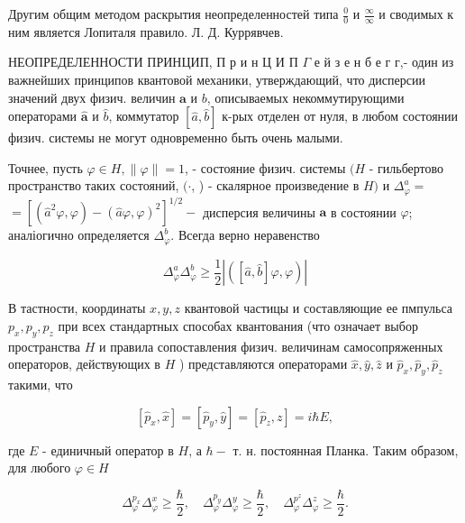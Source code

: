 \documentclass[10pt]{article}
\begin{document}
Другим общим методом раскрытия неопределенностей типа $\frac{0}{0}$ и $\frac{\infty}{\infty}$ и сводимых к ним является Лопиталя правило. Л. Д. Куррявчев.



НЕОПРЕДЕЛЕННОСТИ ПРИНЦИП, П р и н Ц И П $\Gamma$ е й з е н б е г г,- один из важнейших принципов квантовой механики, утверждающий, что дисперсии значений двух физич. величин $\boldsymbol{a}$ и $b$, описываемых некоммутирующими операторами $\hat{\boldsymbol{a}}$ и $\hat{b}$, коммутатор $[\hat{a}, \hat{b}]$ к-рых отделен от нуля, в любом состоянии физич. системы не могут одновременно быть очень малыми.



Точнее, пусть $\varphi \in H,\|\varphi\|=1$, - состояние физич. системы $(H$ - гильбертово пространство таких состояний, $(\cdot$, ) - скалярное произведение в $H)$ и $\Delta_{\varphi}^{a}=$ $=\left[\left(\hat{a}^{2} \varphi, \varphi\right)-(\hat{a} \varphi, \varphi)^{2}\right]^{1 / 2}-$ дисперсия величины $\boldsymbol{a}$ в состоянии $\varphi$; аналіогично определяется $\Delta_{\varphi}^{b}$. Всегда верно неравенство



\[

\Delta_{\varphi}^{a} \Delta_{\varphi}^{b} \geqslant \frac{1}{2}|([\hat{a}, \hat{b}] \varphi, \varphi)|

\]



В тастности, координаты $x, y, z$ квантовой частицы и составляющие ее пмпульса $p_{x}, p_{y}, p_{z}$ при всех стандартных способах квантования (что означает выбор пространства $H$ и правила сопоставления физич. величинам самосопряженных операторов, действующих в $H$ ) представляются операторами $\hat{x}, \hat{y}, \hat{z}$ и $\hat{p}_{x}, \hat{p}_{y}, \hat{p}_{z}$ такими, что



\[

\left[\hat{p}_{x}, \hat{x}\right]=\left[\hat{p}_{y}, \hat{y}\right]=\left[\hat{p}_{z}, z\right]=i \hbar E,

\]



где $E$ - единичный оператор в $H$, а $\hbar-$ т. н. постоянная Планка. Таким образом, для любого $\varphi \in H$



\[

\Delta_{\varphi}^{p_{x}} \Delta_{\varphi}^{x} \geqslant \frac{\hbar}{2}, \quad \Delta_{\varphi}^{p_{y}} \Delta_{\varphi}^{y} \geqslant \frac{\hbar}{2}, \quad \Delta_{\varphi}^{p^{z}} \Delta_{\varphi}^{z} \geqslant \frac{\hbar}{2} .

\]
\end{document}
